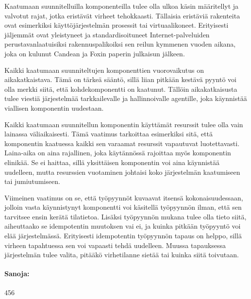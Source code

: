 \documentclass[a4paper,12pt]{article}
\begin{document}
Kaatumaan suunnitelluilla komponenteilla tulee olla ulkoa käsin määritellyt ja valvotut rajat, jotka eristävät virheet tehokkaasti. Tällaisia eristäviä rakenteita ovat esimerkiksi käyttöjärjestelmän prosessit tai virtuaalikoneet. Erityisesti jäljemmät ovat yleistyneet ja standardisoituneet Internet-palveluiden perustavanlaatuisiksi rakennuspalikoiksi sen reilun kymmenen vuoden aikana, joka on kulunut Candean ja Foxin paperin julkaisun jälkeen.

Kaikki kaatumaan suunniteltujen komponenttien vuorovaikutus on aikakatkaistava. Tämä on tärkeä sääntö, sillä liian pitkään kestävä pyyntö voi olla merkki siitä, että kohdekomponentti on kaatunut. Tällöin aikakatkaisusta tulee viestiä järjestelmää tarkkailevalle ja hallinnoivalle agentille, joka käynnistää viallisen komponentin uudestaan.

Kaikki kaatumaan suunnitellun komponentin käyttämät resurssit tulee olla vain lainassa väliaikaisesti. Tämä vaatimus tarkoittaa esimerkiksi sitä, että komponentin kaatuessa kaikki sen varaamat resurssit vapautuvat luotettavasti. Laina-aika on aina rajallinen, joka käytännössä rajoittaa myös komponentin elinikää. Se ei haittaa, sillä yksittäisen komponentin voi aina käynnistää uudelleen, mutta resurssien vuotaminen johtaisi koko järjestelmän kaatumiseen tai jumiutumiseen.

Viimeinen vaatimus on se, että työpyynnöt kuvaavat itsensä kokonaisuudessaan, jolloin vasta käynnistynyt komponentti voi käsitellä työpyynnön ilman, että sen tarvitsee ensin kerätä tilatietoa. Lisäksi työpyynnön mukana tulee olla tieto siitä, aiheuttaako se idempotentin muutoksen vai ei, ja kuinka pitkään työpyyntö voi elää järjestelmässä. Erityisesti idempotentin työpyynnön tapaus on helppo, sillä virheen tapahtuessa sen voi vapaasti tehdä uudelleen. Muussa tapauksessa järjestelmän tulee valita, pitääkö virhetilanne sietää tai kuinka siitä toivutaan.

\vspace{5.5em}

\paragraph{Sanoja:} 456

\begin{bibdiv}
\begin{biblist}


\end{biblist}
\end{bibdiv}
\end{document}
